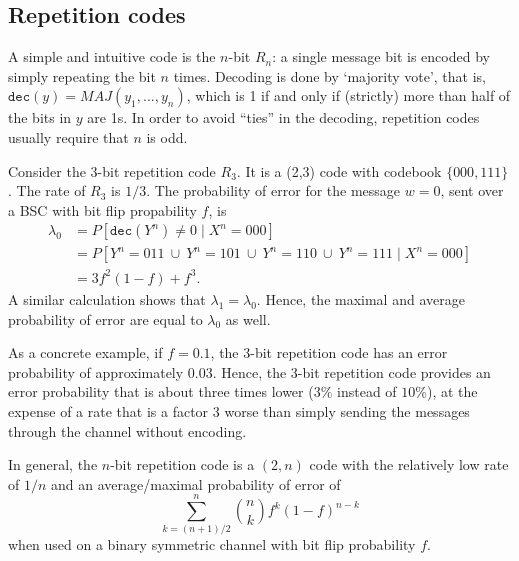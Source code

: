 \subsection{Repetition codes}
A simple and intuitive code is the $n$-bit  $R_n$: a single message bit is encoded by simply repeating the bit $n$ times. Decoding is done by `majority vote', that is, $\mathtt{dec}(y) = MAJ(y_1, ..., y_n)$, which is 1 if and only if (strictly) more than half of the bits in $y$ are 1s. In order to avoid ``ties'' in the decoding, repetition codes usually require that $n$ is odd.

\begin{example}
Consider the 3-bit repetition code $R_3$. It is a (2,3) code with codebook $\{000,111\}$. The rate of $R_3$ is $1/3$. The probability of error for the message $w = 0$, sent over a BSC with bit flip propability $f$, is
\begin{align*}
\lambda_0 &= P[\mathtt{dec}(Y^n) \neq 0 \mid X^n = 000]\\
&= P[Y^n = 011 \ \cup \ Y^n = 101 \ \cup \ Y^n = 110 \ \cup \ Y^n = 111 \mid X^n = 000]\\
&= 3f^2(1-f) + f^3.
\end{align*}
A similar calculation shows that $\lambda_1 = \lambda_0$. Hence, the maximal and average probability of error are equal to $\lambda_0$ as well.

As a concrete example, if $f = 0.1$, the 3-bit repetition code has an error probability of approximately 0.03. Hence, the 3-bit repetition code provides an error probability that is about three times lower ($3\%$ instead of $10\%$), at the expense of a rate that is a factor 3 worse than simply sending the messages through the channel without encoding.
\end{example}
In general, the $n$-bit repetition code is a $(2,n)$ code with the relatively low rate of $1/n$ and an average/maximal probability of error of
\[
\sum_{k=(n+1)/2}^n {n \choose k} f^k (1-f)^{n-k}
\]
when used on a binary symmetric channel with bit flip probability $f$.

